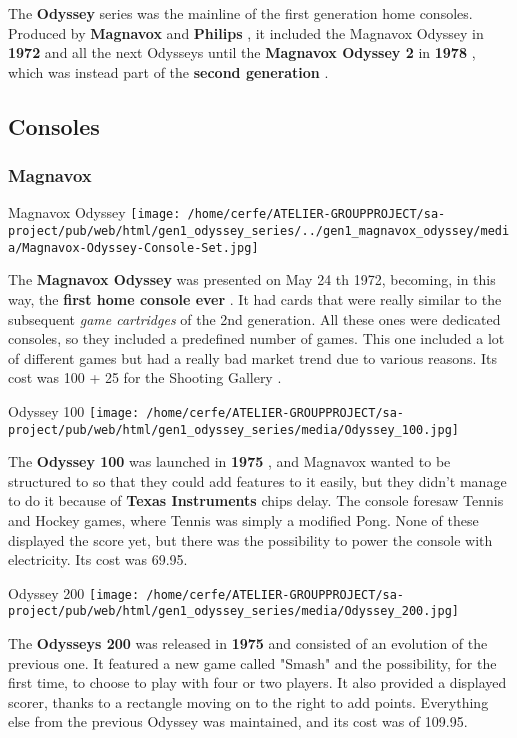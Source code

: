 \documentclass[a4paper,10pt]{book}
\begin{document}
          The  \textbf{Odyssey }  series was the mainline of the first generation home consoles.
          Produced by  \textbf{Magnavox }  and  \textbf{Philips } , it included the
           Magnavox Odyssey  in  \textbf{1972 } 
          and all the next Odysseys until the  \textbf{Magnavox Odyssey 2 }  in  \textbf{1978 } , which was instead
          part of the  \textbf{second generation } .
         
 
 \subsection{Consoles }
 \subsubsection{Magnavox }
 Magnavox Odyssey 
 \texttt{[image: /home/cerfe/ATELIER-GROUPPROJECT/sa-project/pub/web/html/gen1\_odyssey\_series/../gen1\_magnavox\_odyssey/media/Magnavox-Odyssey-Console-Set.jpg]}
 
          The  \textbf{Magnavox Odyssey }  was
          presented on May 24 th  1972, becoming, in this way, the  \textbf{first home console ever } .
          It had cards that were really similar to the subsequent  \textit{game cartridges } of the 2nd generation.
          All these ones were dedicated consoles, so they included a predefined number of games.
          This one included a lot of different games but had a really bad market trend due to various reasons.  
          Its cost was 100 + 25 for the  Shooting Gallery .
         
 
 Odyssey 100 
 \texttt{[image: /home/cerfe/ATELIER-GROUPPROJECT/sa-project/pub/web/html/gen1\_odyssey\_series/media/Odyssey\_100.jpg]}
 
          The  \textbf{Odyssey 100 }  was launched in  \textbf{1975 } , and Magnavox wanted to be structured to so that
          they could add features to it easily, but they didn't manage to do it because of  \textbf{Texas Instruments } 
          chips delay. The console foresaw Tennis and Hockey games, where Tennis was simply a modified Pong.
          None of these displayed the score yet, but there was the possibility to power the console with electricity.  
          Its cost was 69.95.
         
 
 Odyssey 200 
 \texttt{[image: /home/cerfe/ATELIER-GROUPPROJECT/sa-project/pub/web/html/gen1\_odyssey\_series/media/Odyssey\_200.jpg]}
 
          The  \textbf{Odysseys 200 }  was released in  \textbf{1975 }  and consisted of an evolution of the previous one.
          It featured a new game called "Smash" and the possibility, for the first time, to choose to play with
          four or two players. It also provided a displayed scorer, thanks to a rectangle moving on to the right to add points.
          Everything else from the previous Odyssey was maintained, and its cost was of 109.95.
         
\end{document}

